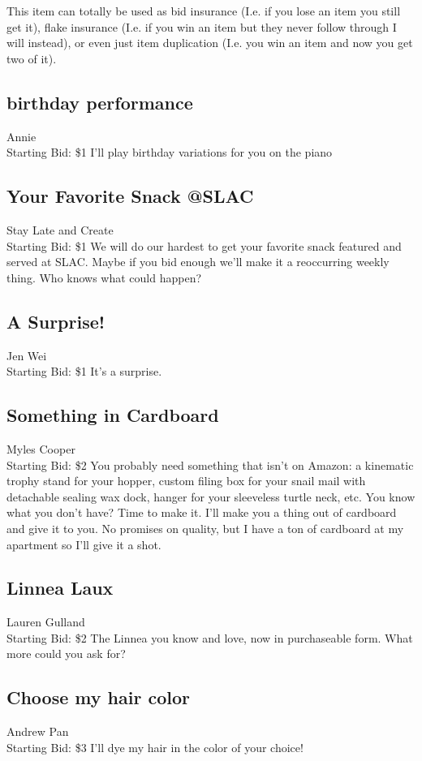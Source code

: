 \documentclass[11pt]{article}
\begin{document}
This item can totally be used as bid insurance (I.e. if you lose an item you still get it), flake insurance (I.e. if you win an item but they never follow through I will instead), or even just item duplication (I.e. you win an item and now you get two of it).
\subsection{birthday performance}
Annie 
\\
Starting Bid: \$1
\newline
I'll play birthday variations for you on the piano
\subsection{Your Favorite Snack @SLAC}
Stay Late and Create
\\
Starting Bid: \$1
\newline
We will do our hardest to get your favorite snack featured and served at SLAC. Maybe if you bid enough we'll make it a reoccurring weekly thing. Who knows what could happen?
\subsection{A Surprise!}
Jen Wei
\\
Starting Bid: \$1
\newline
It's a surprise.
\subsection{Something in Cardboard}
Myles Cooper
\\
Starting Bid: \$2
\newline
You probably need something that isn't on Amazon: a kinematic trophy stand for your hopper, custom filing box for your snail mail with detachable sealing wax dock, hanger for your sleeveless turtle neck, etc. You know what you don't have? Time to make it. I'll make you a thing out of cardboard and give it to you. No promises on quality, but I have a ton of cardboard at my apartment so I'll give it a shot.
\subsection{Linnea Laux}
Lauren Gulland
\\
Starting Bid: \$2
\newline
The Linnea you know and love, now in purchaseable form. What more could you ask for?
\subsection{Choose my hair color}
Andrew Pan
\\
Starting Bid: \$3
\newline
I'll dye my hair in the color of your choice!
\end{document}
